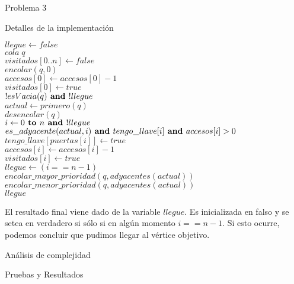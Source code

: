 \begin{section}{Problema 3}
\begin{subsection}{Detalles de la implementación}
		\begin{pseudo}
		\tab $llegue \leftarrow false$\\
		\tab $cola\; q$\\
		\tab $visitados[0..n] \leftarrow false$\\ 
		\tab $encolar(q,0)$\\
		\tab $accesos[0] \leftarrow accesos[0]-1$\\
		\tab $visitados[0] \leftarrow true$\\
		\tab \WHILE $!esVacia(q) \textbf{ and } !llegue$\\
		\tab \tab $actual \leftarrow primero(q)$\\
		\tab \tab $desencolar(q)$\\
		\tab \tab \FOR $ i\leftarrow0 \textbf{ to } n \textbf{ and } !llegue$\\
		\tab \tab \tab \IF $es\_adyacente(actual,i) \textbf{ and } tengo\_llave[i] \textbf{ and } accesos[i]>0$\\
		\tab \tab \tab \tab $tengo\_llave[puertas[i]] \leftarrow true$\\
		\tab \tab \tab \tab $accesos[i] \leftarrow accesos[i]-1$\\
		\tab \tab \tab \tab $visitados[i] \leftarrow true$\\
		\tab \tab \tab \tab $llegue \leftarrow (i == n-1)$\\
		\tab \tab $encolar\_mayor\_prioridad(q, adyacentes(actual))$\\
		\tab \tab $encolar\_menor\_prioridad(q, adyacentes(actual))$\\
		\tab \RET $llegue$\\
		\end{pseudo}

		El resultado final viene dado de la variable $llegue$. Es inicializada en falso y se setea en verdadero si sólo si en algún momento $i == n-1$. Si esto ocurre, podemos concluir que pudimos llegar al vértice objetivo.\\
	\end{subsection}


	\begin{subsection}{Análisis de complejidad}
		
	\end{subsection}


	\begin{subsection}{Pruebas y Resultados}

	\end{subsection}

\end{section}

